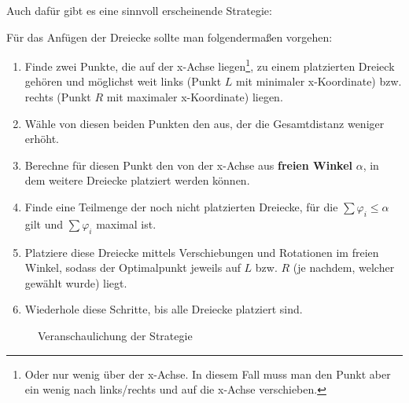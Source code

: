 \documentclass[a4paper, notitlepage, 12pt]{scrartcl}
\begin{document}
Auch dafür gibt es eine sinnvoll erscheinende Strategie:
\begin{kasten}
	Für das Anfügen der Dreiecke sollte man folgendermaßen vorgehen:
	\begin{enumerate}
		\item Finde zwei Punkte, die auf der x-Achse liegen\footnote{Oder nur wenig über der x-Achse. In diesem Fall muss man den Punkt aber ein wenig nach links/rechts und auf die x-Achse verschieben.}, zu einem platzierten Dreieck gehören und möglichst weit links (Punkt $L$ mit minimaler x-Koordinate) bzw. rechts (Punkt $R$ mit maximaler x-Koordinate) liegen.
		\item Wähle von diesen beiden Punkten den aus, der die Gesamtdistanz weniger erhöht.
		\item Berechne für diesen Punkt den von der x-Achse aus \textbf{freien Winkel} $\alpha$, in dem weitere Dreiecke platziert werden können.
		\item Finde eine Teilmenge der noch nicht platzierten Dreiecke, für die $\sum \varphi_i \leq \alpha$ gilt und $\sum \varphi_i$ maximal ist. 
		\item Platziere diese Dreiecke mittels Verschiebungen und Rotationen im freien Winkel, sodass der Optimalpunkt jeweils auf $L$ bzw. $R$ (je nachdem, welcher gewählt wurde) liegt.
		\item Wiederhole diese Schritte, bis alle Dreiecke platziert sind.
	\end{enumerate}
\end{kasten}
\begin{figure}[H]
	\centering {}
	\caption{Veranschaulichung der Strategie}
\end{figure}
\end{document}
